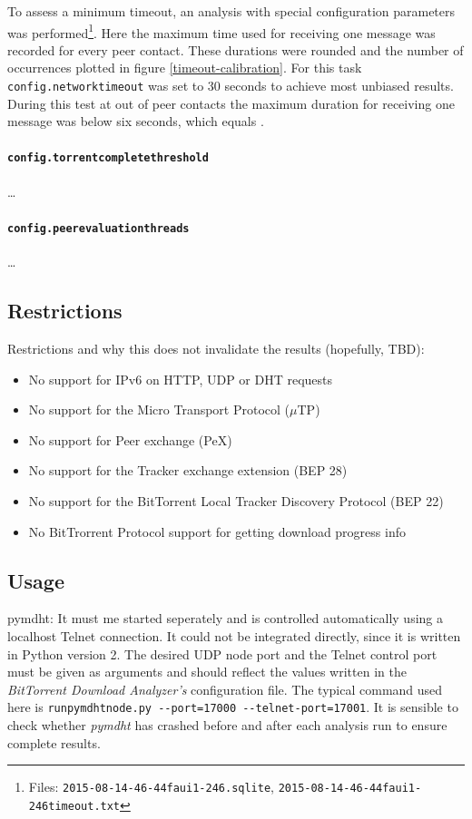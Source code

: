 \documentclass[10pt, a4paper, twoside]{scrartcl}
\renewcommand{\_}{\origunderscore\allowbreak}
\newcommand{\config}[1]{\texttt{config.\allowbreak #1}}
\begin{document}
To assess a minimum timeout, an analysis with special configuration parameters was performed\footnote{Files: \texttt{2015-08-14\_17-46-44\_faui1-246.sqlite}, \texttt{2015-08-14\_17-46-44\_faui1-246\_timeout.txt}}. Here the maximum time used for receiving one message was recorded for every peer contact. These durations were rounded and the number of occurrences plotted in figure \ref{timeout-calibration}. For this task \config{network\_timeout} was set to 30 seconds to achieve most unbiased results. During this test at  out of  peer contacts the maximum duration for receiving one message was below six seconds, which equals .

\paragraph{\config{torrent\_complete\_threshold}}
\dots

\paragraph{\config{peer\_evaluation\_threads}}
\dots

\subsection{Restrictions}

Restrictions and why this does not invalidate the results (hopefully, TBD):

\begin{itemize}
  \item No support for IPv6 on HTTP, UDP or DHT requests
  \item No support for the Micro Transport Protocol ($\mu$TP)
  \item No support for Peer exchange (PeX)
  \item No support for the Tracker exchange extension (BEP 28)
  \item No support for the BitTorrent Local Tracker Discovery Protocol (BEP 22)
  \item No BitTrorrent Protocol support for getting download progress info
\end{itemize}

\subsection{Usage}
pymdht: It must me started seperately and is controlled automatically using a localhost Telnet connection. It could not be integrated directly, since it is written in Python version 2. The desired UDP node port and the Telnet control port must be given as arguments and should reflect the values written in the \emph{BitTorrent Download Analyzer's} configuration file. The typical command used here is \texttt{run\_pymdht\_node.py -{}-port=17000 -{}-telnet-port=17001}. It is sensible to check whether \emph{pymdht} has crashed before and after each analysis run to ensure complete results.
\end{document}
